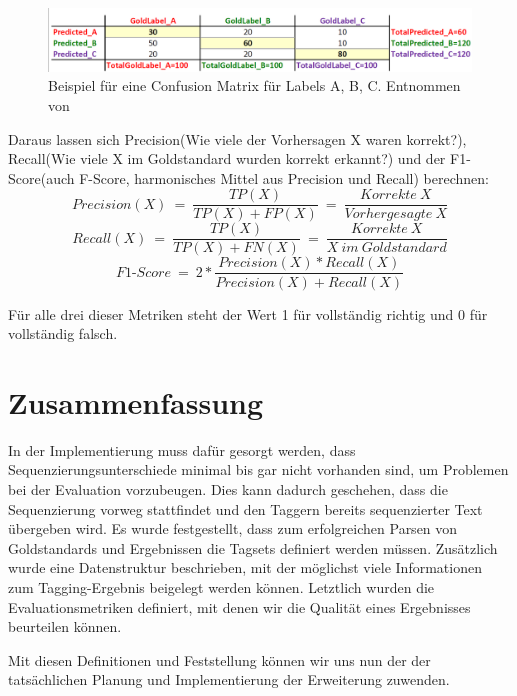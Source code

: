\begin{figure}[htb]
	\includegraphics[width=\textwidth]{gfx/multi-class-confusionmatrix.png}
	\caption{Beispiel für eine Confusion Matrix für Labels A, B, C. Entnommen von \cite{Web:rxnlp}}
	\label{fig:intro:pos:metrics:confusion}
\end{figure}

Daraus lassen sich Precision(Wie viele der Vorhersagen X waren korrekt?), Recall(Wie viele X im Goldstandard wurden korrekt erkannt?) und der F1-Score(auch F-Score, harmonisches Mittel aus Precision und Recall) berechnen:
\[ Precision(X) \: = \: \frac{TP(X)}{TP(X)+FP(X)}\: = \: \frac{Korrekte\:X}{Vorhergesagte\:X} \]
\[ Recall(X) \: = \: \frac{TP(X)}{TP(X)+FN(X)} \: = \: \frac{Korrekte\:X}{X\:im\:Goldstandard} \]
\[ F1\mbox{-}Score \: = \: 2*\frac{Precision(X)*Recall(X)}{Precision(X)+Recall(X)} \]

Für alle drei dieser Metriken steht der Wert 1 für vollständig richtig und 0 für vollständig falsch.


\section{Zusammenfassung}
\label{sec:concept:conclusion}

In der Implementierung muss dafür gesorgt werden, dass Sequenzierungsunterschiede minimal bis gar nicht vorhanden sind, um Problemen bei der Evaluation vorzubeugen. Dies kann dadurch geschehen, dass die Sequenzierung vorweg stattfindet und den Taggern bereits sequenzierter Text übergeben wird. Es wurde festgestellt, dass zum erfolgreichen Parsen von Goldstandards und Ergebnissen die Tagsets definiert werden müssen. Zusätzlich wurde eine Datenstruktur beschrieben, mit der möglichst viele Informationen zum Tagging-Ergebnis beigelegt werden können. Letztlich wurden die Evaluationsmetriken definiert, mit denen wir die Qualität eines Ergebnisses beurteilen können.

Mit diesen Definitionen und Feststellung können wir uns nun der der tatsächlichen Planung und Implementierung der Erweiterung zuwenden.
